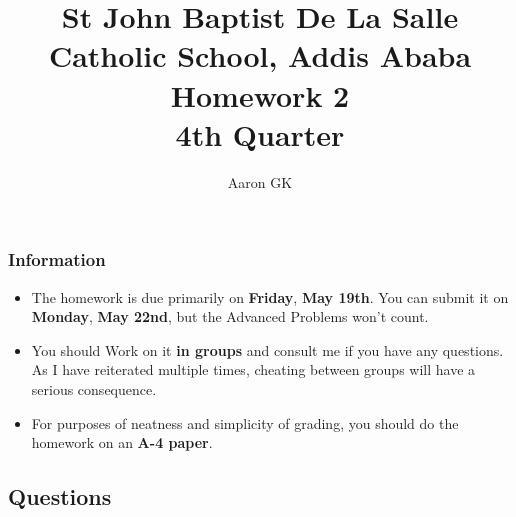 \documentclass[11pt,addpoints]{exam}
\author{Aaron GK}
\begin{document}
	\title{St John Baptist De La Salle Catholic School, Addis Ababa\\
		\large Homework 2 \\
		4th Quarter}
	\maketitle
	\begin{center}
		\subsubsection*{Information}
		\begin{itemize}
			\item The homework is due primarily on \textbf{Friday}, \textbf{May 19th}. You can submit it on \textbf{Monday}, \textbf{May 22nd}, but the Advanced Problems won't count.
			\item You should Work on it \textbf{in groups} and consult me if you have any questions. As I have reiterated multiple times, cheating between groups will have a serious consequence.
			\item For purposes of neatness and simplicity of grading, you should do the homework on an \textbf{A-4 paper}.
		\end{itemize}
	\end{center}
	\begin{center}
		\subsection*{Questions}
	\end{center}
	
\end{document}
